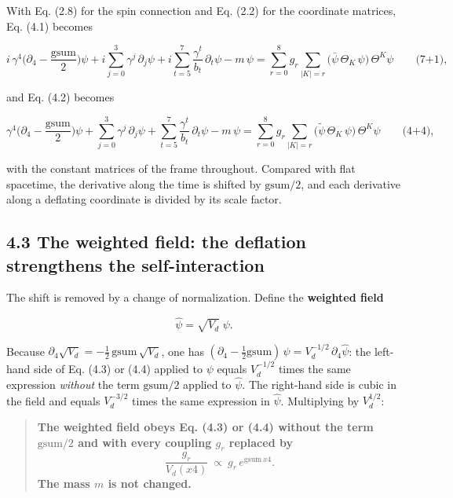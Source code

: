 \documentclass[
  10pt,
]{article}
\begin{document}
With Eq. (2.8) for the spin connection and Eq. (2.2) for the coordinate
matrices, Eq. (4.1) becomes

\[i\,\gamma^4\Big(\partial_4-\frac{\mathrm{gsum}}{2}\Big)\psi+i\sum_{j=0}^{3}\gamma^j\,\partial_j\psi
+i\sum_{t=5}^{7}\frac{\gamma^t}{b_t}\,\partial_t\psi-m\,\psi
=\sum_{r=0}^{8}g_r\sum_{|K|=r}\big(\bar\psi\,\Theta_K\,\psi\big)\,\Theta^K\psi\qquad\text{(7+1)},\tag{4.3}\]

and Eq. (4.2) becomes

\[\gamma^4\Big(\partial_4-\frac{\mathrm{gsum}}{2}\Big)\psi+\sum_{j=0}^{3}\gamma^j\,\partial_j\psi
+\sum_{t=5}^{7}\frac{\gamma^t}{b_t}\,\partial_t\psi-m\,\psi
=\sum_{r=0}^{8}g_r\sum_{|K|=r}\big(\tilde\psi\,\Theta_K\,\psi\big)\,\Theta^K\psi\qquad\text{(4+4)},\tag{4.4}\]

with the constant matrices of the frame throughout. Compared with flat
spacetime, the derivative along the time is shifted by
\(\mathrm{gsum}/2\), and each derivative along a deflating coordinate is
divided by its scale factor.

\hypertarget{the-weighted-field-the-deflation-strengthens-the-self-interaction}{%
\subsection{4.3 The weighted field: the deflation strengthens the
self-interaction}\label{the-weighted-field-the-deflation-strengthens-the-self-interaction}}

The shift is removed by a change of normalization. Define the
\textbf{weighted field}

\[\hat\psi=\sqrt{V_d}\;\psi.\tag{4.5}\]

Because \(\partial_4\sqrt{V_d}=-\tfrac12\,\mathrm{gsum}\,\sqrt{V_d}\),
one has
\((\partial_4-\tfrac12\mathrm{gsum})\,\psi=V_d^{-1/2}\,\partial_4\hat\psi\):
the left-hand side of Eq. (4.3) or (4.4) applied to \(\psi\) equals
\(V_d^{-1/2}\) times the same expression \emph{without} the term
\(\mathrm{gsum}/2\) applied to \(\hat\psi\). The right-hand side is
cubic in the field and equals \(V_d^{-3/2}\) times the same expression
in \(\hat\psi\). Multiplying by \(V_d^{1/2}\):

\begin{quote}
\textbf{The weighted field obeys Eq. (4.3) or (4.4) without the term
\(\mathrm{gsum}/2\) and with every coupling \(g_r\) replaced by}
\[\frac{g_r}{V_d(x4)}\ \propto\ g_r\,e^{\mathrm{gsum}\,x4}.\tag{4.6}\]
\textbf{The mass \(m\) is not changed.}
\end{quote}
\end{document}
